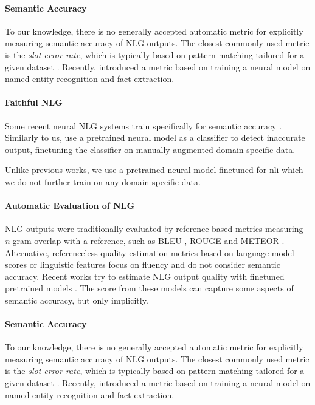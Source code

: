 \paragraph{Semantic Accuracy}
To our knowledge, there is no generally accepted automatic metric for explicitly measuring semantic accuracy of NLG outputs. The closest commonly used metric is the \textit{slot error rate}, which is typically based on pattern matching tailored for a given dataset \cite{reed-etal-2018-neural,ijcai2019-437,duvsek2020evaluating}. Recently, \citet{goodrich_assessing_2019} introduced a metric based on training a neural model on named-entity recognition and fact extraction.

\paragraph{Faithful NLG}
Some recent neural NLG systems %
train specifically for semantic accuracy
\cite{nie-etal-2019-simple,tian2019sticking,kedzie-mckeown-2019-good}. Similarly to us, \citet{harkous2020have} use a pretrained neural model as a classifier to detect inaccurate output, finetuning the classifier on manually augmented domain-specific data.

Unlike previous works, we use a pretrained neural model finetuned for \ac{nli} which we do not further train on any domain-specific data.
\paragraph{Automatic Evaluation of NLG} NLG outputs were traditionally evaluated by reference-based metrics measuring \emph{n}-gram overlap with a reference, such as BLEU \cite{papineni-etal-2002-bleu}, ROUGE \cite{lin-2004-rouge} and METEOR \cite{lavie_meteor:_2007}. Alternative, referenceless quality estimation metrics based on language model scores \cite{kann_sentence-level_2018} or linguistic features \cite{tian_treat_2018} focus on fluency and do not consider semantic accuracy. Recent works try to estimate NLG output quality with finetuned pretrained models \cite{zhou_learning_2020,zhang_bertscore:_2020,sellam_bleurt_2020}. The score from these models can capture some aspects of semantic accuracy, but only implicitly.

\paragraph{Semantic Accuracy}
To our knowledge, there is no generally accepted automatic metric for explicitly measuring semantic accuracy of NLG outputs. %
The closest commonly used metric is the \textit{slot error rate}, %
which is typically based on pattern matching tailored for a given dataset \cite{reed-etal-2018-neural,ijcai2019-437,duvsek2020evaluating}. Recently, \citet{goodrich_assessing_2019} introduced a metric based on training a neural model on named-entity recognition and fact extraction.

